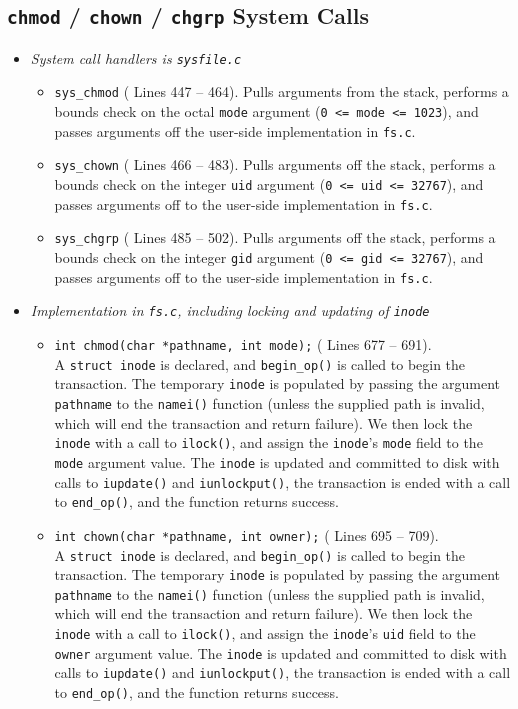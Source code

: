 \documentclass[11pt,letterpaper]{report}
\begin{document}
	\subsection{{\tt chmod} / {\tt chown} / {\tt chgrp} System Calls}
	\begin{itemize}
		\item \emph{System call handlers is {\tt sysfile.c}}
		\begin{itemize}
			\item {\tt sys\_chmod} ({\color{red} Lines 447 -- 464}). Pulls arguments from the stack, performs a bounds check on the octal {\tt mode} argument ({\tt 0 <= mode <= 1023}), and passes arguments off the user-side implementation in {\tt fs.c}.
			\item {\tt sys\_chown} ({\color{red} Lines 466 -- 483}). Pulls arguments off the stack, performs a bounds check on the integer {\tt uid} argument ({\tt 0 <= uid <= 32767}), and passes arguments off to the user-side implementation in {\tt fs.c}.
			\item {\tt sys\_chgrp} ({\color{red} Lines 485 -- 502}). Pulls arguments off the stack, performs a bounds check on the integer {\tt gid} argument ({\tt 0 <= gid <= 32767}), and passes arguments off to the user-side implementation in {\tt fs.c}.
		\end{itemize}
		
		\item \emph{Implementation in {\tt fs.c}, including locking and updating of {\tt inode}}
		\begin{itemize}
			\item {\tt int chmod(char *pathname, int mode);} ({\color{red} Lines 677 -- 691}).\\
			A {\tt struct inode} is declared, and {\tt begin\_op()} is called to begin the transaction. The temporary {\tt inode} is populated by passing the argument {\tt pathname} to the {\tt namei()} function (unless the supplied path is invalid, which will end the transaction and return failure). We then lock the {\tt inode} with a call to {\tt ilock()}, and assign the {\tt inode}'s {\tt mode} field to the {\tt mode} argument value. The {\tt inode} is updated and committed to disk with calls to {\tt iupdate()} and {\tt iunlockput()}, the transaction is ended with a call to {\tt end\_op()}, and the function returns success.
			
			\item {\tt int chown(char *pathname, int owner);} ({\color{red} Lines 695 -- 709}).\\
			A {\tt struct inode} is declared, and {\tt begin\_op()} is called to begin the transaction. The temporary {\tt inode} is populated by passing the argument {\tt pathname} to the {\tt namei()} function (unless the supplied path is invalid, which will end the transaction and return failure). We then lock the {\tt inode} with a call to {\tt ilock()}, and assign the {\tt inode}'s {\tt uid} field to the {\tt owner} argument value. The {\tt inode} is updated and committed to disk with calls to {\tt iupdate()} and {\tt iunlockput()}, the transaction is ended with a call to {\tt end\_op()}, and the function returns success.
			

\end{itemize}
\end{itemize}
\end{document}
